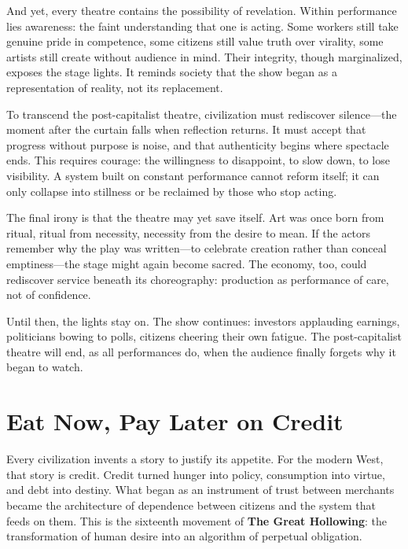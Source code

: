 \documentclass[11pt,twoside]{book}
\begin{document}
And yet, every theatre contains the possibility of revelation.  Within performance lies awareness: the faint understanding that one is acting.  Some workers still take genuine pride in competence, some citizens still value truth over virality, some artists still create without audience in mind.  Their integrity, though marginalized, exposes the stage lights.  It reminds society that the show began as a representation of reality, not its replacement.

To transcend the post-capitalist theatre, civilization must rediscover silence—the moment after the curtain falls when reflection returns.  It must accept that progress without purpose is noise, and that authenticity begins where spectacle ends.  This requires courage: the willingness to disappoint, to slow down, to lose visibility.  A system built on constant performance cannot reform itself; it can only collapse into stillness or be reclaimed by those who stop acting.

The final irony is that the theatre may yet save itself.  Art was once born from ritual, ritual from necessity, necessity from the desire to mean.  If the actors remember why the play was written—to celebrate creation rather than conceal emptiness—the stage might again become sacred.  The economy, too, could rediscover service beneath its choreography: production as performance of care, not of confidence.

Until then, the lights stay on.  The show continues: investors applauding earnings, politicians bowing to polls, citizens cheering their own fatigue.  The post-capitalist theatre will end, as all performances do, when the audience finally forgets why it began to watch.

\chapter{Eat Now, Pay Later on Credit}
\label{ch:16}

Every civilization invents a story to justify its appetite.  
For the modern West, that story is credit.  Credit turned hunger into policy, consumption into virtue, and debt into destiny.  
What began as an instrument of trust between merchants became the architecture of dependence between citizens and the system that feeds on them.  
This is the sixteenth movement of \textbf{The Great Hollowing}: the transformation of human desire into an algorithm of perpetual obligation.
\end{document}
